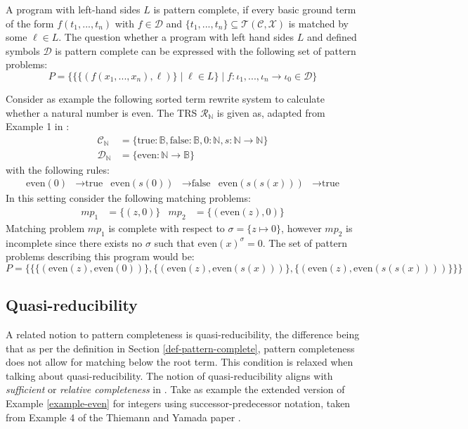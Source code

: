 A program with left-hand sides $L$ is pattern complete, if every basic ground term of the form $f(t_1, ..., t_n)$ with $f \in \mathcal{D}$ and $\{t_1, ..., t_n\} \subseteq \mathcal{T}(\mathcal{C}, \mathcal{X})$ is matched by some $\ell \in L$. The question whether a program with left hand sides $L$ and defined symbols $\mathcal{D}$ is pattern complete can be expressed with the following set of pattern problems\cite{thiemann}:
$$P = \{\{\{(f(x_1, ..., x_n), \ell)\} \mid \ell \in L\} \mid f: \iota_1, ..., \iota_n \rightarrow \iota_0 \in \mathcal{D}\}$$

\begin{example} \label{example-even}
Consider as example the following sorted term rewrite system to calculate whether a natural number is even. The TRS $\mathcal{R}_\mathbb{N}$ is given as, adapted from Example 1 in \cite{thiemann}:
\begin{align*}
   \mathcal{C}_{\mathbb{N}} &= \{\text{true}: \mathbb{B}, \text{false}: \mathbb{B}, 0: \mathbb{N}, s: \mathbb{N} \rightarrow \mathbb{N}\} \\
\mathcal{D}_{\mathbb{N}} &= \{\text{even}: \mathbb{N} \rightarrow \mathbb{B}\} 
\end{align*}
with the following rules:
\begin{align*}
    \text{even}(0) &\rightarrow \text{true} & \text{even}(s(0)) &\rightarrow \text{false} & \text{even}(s(s(x))) &\rightarrow \text{true}
\end{align*}
In this setting consider the following matching problems:
\begin{align*}
    mp_1 &= \{(z, 0)\} & mp_2 &= \{(\text{even}(z), 0)\}
\end{align*}
Matching problem $mp_1$ is complete with respect to $\sigma = \{z \mapsto 0\}$, however $mp_2$ is incomplete since there exists no $\sigma$ such that $\text{even}(x)^\sigma = 0$. The set of pattern problems describing this program would be: $$P = \{\{\{(\text{even}(z), \text{even}(0))\}, \{(\text{even}(z), \text{even}(s(x)))\}, \{(\text{even}(z), \text{even}(s(s(x))))\}\}\}$$
\end{example}

\subsection{Quasi-reducibility} \label{quasi-intro}
A related notion to pattern completeness is quasi-reducibility, the difference being that as per the definition in Section \ref{def-pattern-complete}, pattern completeness does not allow for matching below the root term. This condition is relaxed when talking about quasi-reducibility. The notion of quasi-reducibility aligns with \textit{sufficient} or \textit{relative completeness} in \cite{lazrek, thiel}.  Take as example the extended version of Example \ref{example-even} for integers using successor-predecessor notation, taken from Example 4 of the Thiemann and Yamada paper \cite{thiemann}.

